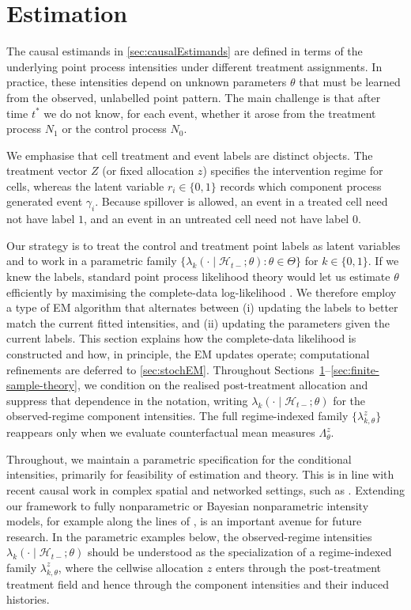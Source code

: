 \documentclass{statsoc}
\newcommand{\1}{\mathbbm{1}}
\begin{document}
\section{Estimation}\label{sec:estimation}

The causal estimands in \cref{sec:causalEstimands} are defined in terms of the underlying point process intensities under different treatment assignments. In practice, these intensities depend on unknown parameters $\theta$ that must be learned from the observed, unlabelled point pattern. The main challenge is that after time $t^\ast$ we do not know, for each event, whether it arose from the treatment process $N_1$ or the control process $N_0$. 

We emphasise that cell treatment and event labels are distinct objects. The treatment vector \(Z\) (or fixed allocation \(z\)) specifies the intervention regime for cells, whereas the latent variable \(r_i\in\{0,1\}\) records which component process generated event \(\gamma_i\). Because spillover is allowed, an event in a treated cell need not have label \(1\), and an event in an untreated cell need not have label \(0\).

Our strategy is to treat the control and treatment point labels as latent variables and to work in a parametric family $\{\lambda_k(\cdot\mid\mathcal H_{t-};\theta):\theta\in\Theta\}$ for $k\in\{0,1\}$. If we knew the labels, standard point process likelihood theory would let us estimate $\theta$ efficiently by maximising the complete-data log-likelihood \citep{ogata1978asymptotic}. We therefore employ a type of EM algorithm that alternates between (i) updating the labels to better match the current fitted intensities, and (ii) updating the parameters given the current labels. This section explains how the complete-data likelihood is constructed and how, in principle, the EM updates operate; computational refinements are deferred to \cref{sec:stochEM}. Throughout Sections~\ref{sec:estimation}--\ref{sec:finite-sample-theory}, we condition on the realised post-treatment allocation and suppress that dependence in the notation, writing \(\lambda_k(\cdot\mid\mathcal H_{t-};\theta)\) for the observed-regime component intensities. The full regime-indexed family \(\{\lambda_{k,\theta}^z\}\) reappears only when we evaluate counterfactual mean measures \(\Lambda_\theta^z\).

Throughout, we maintain a parametric specification for the conditional intensities, primarily for feasibility of estimation and theory. This is in line with recent causal work in complex spatial and networked settings, such as \citet{papadogeorgou2022causal}. Extending our framework to fully nonparametric or Bayesian nonparametric intensity models, for example along the lines of \citet{rousseau2025estimation}, is an important avenue for future research. 
In the parametric examples below, the observed-regime intensities \(\lambda_k(\cdot\mid \mathcal H_{t-};\theta)\) should be understood as the specialization of a regime-indexed family \(\lambda_{k,\theta}^z\), where the cellwise allocation \(z\) enters through the post-treatment treatment field and hence through the component intensities and their induced histories.
\end{document}
